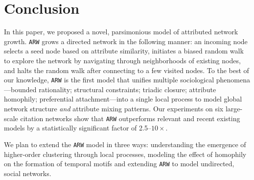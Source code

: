 \section{Conclusion}
\label{sec:Conclusion}
In this paper, we proposed a novel, parsimonious model of attributed network
growth. \texttt{ARW} grows a directed network in the following manner: an
incoming node selects a seed node based on attribute similarity, initiates a
biased random walk to explore the network by navigating through neighborhoods of
existing nodes, and halts the random walk after connecting to a few visited
nodes. To the best of our knowledge, \texttt{ARW} is the first model that
unifies multiple sociological phenomena---bounded rationality; structural
constraints; triadic closure; attribute homophily; preferential
attachment---into a single local process to model global network structure
\textit{and} attribute mixing patterns. Our experiments on six
large-scale citation networks show that \texttt{ARW} outperforms
relevant and recent existing models by a statistically significant
factor of 2.5--$10\times$.

We plan to extend the \texttt{ARW} model in three ways: understanding the
emergence of higher-order clustering \cite{yin2018higher} through local processes, modeling the
effect of homophily on the formation of temporal motifs \cite{paranjape2017motifs} and
extending \texttt{ARW} to model undirected, social networks.



